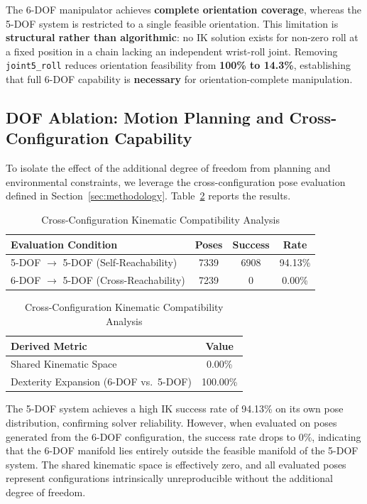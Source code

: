 \documentclass[conference]{IEEEtran}
\begin{document}
	The 6-DOF manipulator achieves \textbf{complete orientation coverage},
	whereas the 5-DOF system is restricted to a single feasible
	orientation. This limitation is \textbf{structural rather than
		algorithmic}: no IK solution exists for non-zero roll at a fixed
	position in a chain lacking an independent wrist-roll joint.
	Removing \texttt{joint5\_roll} reduces orientation feasibility from
	\textbf{100\% to 14.3\%}, establishing that full 6-DOF capability is
	\textbf{necessary} for orientation-complete manipulation.
	
	\subsection{DOF Ablation: Motion Planning and Cross-Configuration
		Capability}
	
	To isolate the effect of the additional degree of freedom from
	planning and environmental constraints, we leverage the
	cross-configuration pose evaluation defined in
	Section~\ref{sec:methodology}. Table~\ref{tab:kinematic_ablation}
	reports the results.
	
	\begin{table}[t]
		\centering
		\caption{Cross-Configuration Kinematic Compatibility Analysis}
		\label{tab:kinematic_ablation}
		\begin{tabular}{l|c|c|c}
			\hline
			\textbf{Evaluation Condition} & \textbf{Poses} & \textbf{Success} & \textbf{Rate} \\
			\hline
			5-DOF $\rightarrow$ 5-DOF (Self-Reachability) & 7339 & 6908 & 94.13\% \\
			6-DOF $\rightarrow$ 5-DOF (Cross-Reachability) & 7239 & 0 & 0.00\% \\
			\hline
		\end{tabular}
		
		\vspace{2mm}
		
		\begin{tabular}{l|c}
			\hline
			\textbf{Derived Metric} & \textbf{Value} \\
			\hline
			Shared Kinematic Space & 0.00\% \\
			Dexterity Expansion (6-DOF vs.\ 5-DOF) & 100.00\% \\
			\hline
		\end{tabular}
	\end{table}
	
	The 5-DOF system achieves a high IK success rate of 94.13\% on its
	own pose distribution, confirming solver reliability. However, when
	evaluated on poses generated from the 6-DOF configuration, the success
	rate drops to 0\%, indicating that the 6-DOF manifold lies entirely
	outside the feasible manifold of the 5-DOF system. The shared
	kinematic space is effectively zero, and all evaluated poses represent
	configurations intrinsically unreproducible without the additional
	degree of freedom.
	
\end{document}
